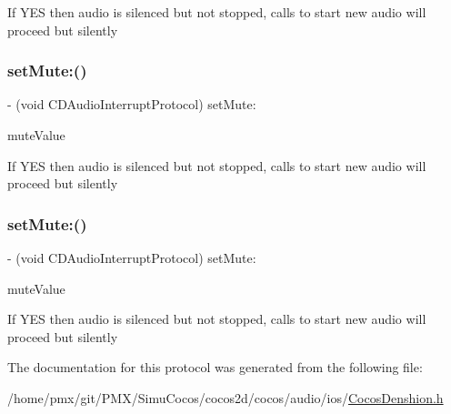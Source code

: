 If Y\+ES then audio is silenced but not stopped, calls to start new audio will proceed but silently \mbox{\label{protocolCDAudioInterruptProtocol_01-p_aaa4811c33b3720f9d9b014e861211563}} 
\subsubsection{\texorpdfstring{set\+Mute\+:()}{setMute:()}\hspace{0.1cm}{\footnotesize\ttfamily [3/4]}}
{\footnotesize\ttfamily -\/ (void C\+D\+Audio\+Interrupt\+Protocol) set\+Mute\+: \begin{DoxyParamCaption}\item[{(B\+O\+OL)}]{mute\+Value }\end{DoxyParamCaption}}

If Y\+ES then audio is silenced but not stopped, calls to start new audio will proceed but silently \mbox{\label{protocolCDAudioInterruptProtocol_01-p_aaa4811c33b3720f9d9b014e861211563}} 
\subsubsection{\texorpdfstring{set\+Mute\+:()}{setMute:()}\hspace{0.1cm}{\footnotesize\ttfamily [4/4]}}
{\footnotesize\ttfamily -\/ (void C\+D\+Audio\+Interrupt\+Protocol) set\+Mute\+: \begin{DoxyParamCaption}\item[{(B\+O\+OL)}]{mute\+Value }\end{DoxyParamCaption}}

If Y\+ES then audio is silenced but not stopped, calls to start new audio will proceed but silently 

The documentation for this protocol was generated from the following file\+:\begin{DoxyCompactItemize}
\item 
/home/pmx/git/\+P\+M\+X/\+Simu\+Cocos/cocos2d/cocos/audio/ios/\hyperlink{cocos2d_2cocos_2audio_2ios_2CocosDenshion_8h}{Cocos\+Denshion.\+h}\end{DoxyCompactItemize}
